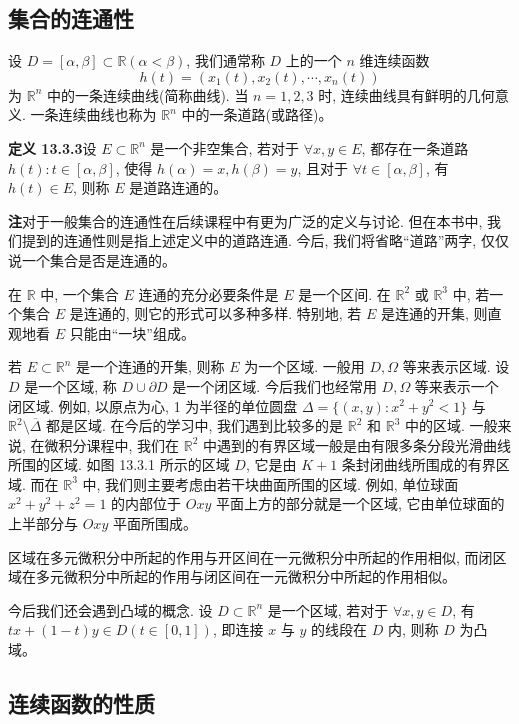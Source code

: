 \documentclass[UTF8, 12pt, fontset=fandol, oneside]{ctexart}
\begin{document}
\subsection{集合的连通性}

设 $D=[\alpha,\beta]\subset\mathbb R(\alpha<\beta)$, 我们通常称 $D$ 上的一个 $n$ 维连续函数
\[
  h(t)=(x_1(t),x_2(t),\cdots,x_n(t))
\]
为 $\mathbb R^n$ 中的一条连续曲线(简称曲线). 当 $n=1,2,3$ 时, 连续曲线具有鲜明的几何意义. 一条连续曲线也称为 $\mathbb R^n$ 中的一条道路(或路径)。

\noindent\textbf{定义 13.3.3}\quad 设 $E\subset\mathbb R^n$ 是一个非空集合, 若对于 $\forall x,y\in E$, 都存在一条道路 $h(t):t\in[\alpha,\beta]$, 使得 $h(\alpha)=x,h(\beta)=y$, 且对于 $\forall t\in[\alpha,\beta]$, 有 $h(t)\in E$, 则称 $E$ 是道路连通的。

\noindent\textbf{注}\quad 对于一般集合的连通性在后续课程中有更为广泛的定义与讨论. 但在本书中, 我们提到的连通性则是指上述定义中的道路连通. 今后, 我们将省略``道路''两字, 仅仅说一个集合是否是连通的。

在 $\mathbb R$ 中, 一个集合 $E$ 连通的充分必要条件是 $E$ 是一个区间. 在 $\mathbb R^2$ 或 $\mathbb R^3$ 中, 若一个集合 $E$ 是连通的, 则它的形式可以多种多样. 特别地, 若 $E$ 是连通的开集, 则直观地看 $E$ 只能由``一块''组成。

若 $E\subset\mathbb R^n$ 是一个连通的开集, 则称 $E$ 为一个区域. 一般用 $D,\Omega$ 等来表示区域. 设 $D$ 是一个区域, 称 $D\cup\partial D$ 是一个闭区域. 今后我们也经常用 $D,\Omega$ 等来表示一个闭区域. 例如, 以原点为心, 1 为半径的单位圆盘 $\Delta=\{(x,y):x^2+y^2<1\}$ 与 $\mathbb R^2\setminus\overline\Delta$ 都是区域. 在今后的学习中, 我们遇到比较多的是 $\mathbb R^2$ 和 $\mathbb R^3$ 中的区域. 一般来说, 在微积分课程中, 我们在 $\mathbb R^2$ 中遇到的有界区域一般是由有限多条分段光滑曲线所围的区域. 如图 13.3.1 所示的区域 $D$, 它是由 $K+1$ 条封闭曲线所围成的有界区域. 而在 $\mathbb R^3$ 中, 我们则主要考虑由若干块曲面所围的区域. 例如, 单位球面 $x^2+y^2+z^2=1$ 的内部位于 $Oxy$ 平面上方的部分就是一个区域, 它由单位球面的上半部分与 $Oxy$ 平面所围成。

区域在多元微积分中所起的作用与开区间在一元微积分中所起的作用相似, 而闭区域在多元微积分中所起的作用与闭区间在一元微积分中所起的作用相似。

今后我们还会遇到凸域的概念. 设 $D\subset\mathbb R^n$ 是一个区域, 若对于 $\forall x,y\in D$, 有 $tx+(1-t)y\in D(t\in[0,1])$, 即连接 $x$ 与 $y$ 的线段在 $D$ 内, 则称 $D$ 为凸域。

\subsection{连续函数的性质}
\end{document}
